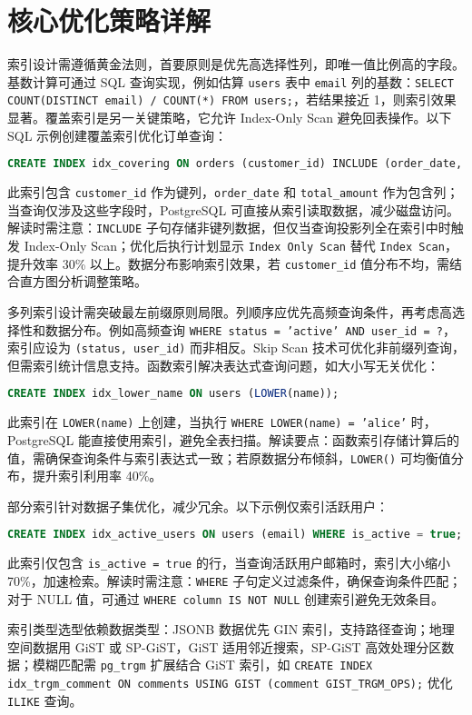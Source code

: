 \chapter{核心优化策略详解}
索引设计需遵循黄金法则，首要原则是优先高选择性列，即唯一值比例高的字段。基数计算可通过 SQL 查询实现，例如估算 \texttt{users} 表中 \texttt{email} 列的基数：\texttt{SELECT COUNT(DISTINCT email) / COUNT(*) FROM users;}，若结果接近 1，则索引效果显著。覆盖索引是另一关键策略，它允许 Index-Only Scan 避免回表操作。以下 SQL 示例创建覆盖索引优化订单查询：\par
\begin{lstlisting}[language=sql]
CREATE INDEX idx_covering ON orders (customer_id) INCLUDE (order_date, total_amount);
\end{lstlisting}
此索引包含 \texttt{customer\_{}id} 作为键列，\texttt{order\_{}date} 和 \texttt{total\_{}amount} 作为包含列；当查询仅涉及这些字段时，PostgreSQL 可直接从索引读取数据，减少磁盘访问。解读时需注意：\texttt{INCLUDE} 子句存储非键列数据，但仅当查询投影列全在索引中时触发 Index-Only Scan；优化后执行计划显示 \texttt{Index Only Scan} 替代 \texttt{Index Scan}，提升效率 30\%{} 以上。数据分布影响索引效果，若 \texttt{customer\_{}id} 值分布不均，需结合直方图分析调整策略。\par
多列索引设计需突破最左前缀原则局限。列顺序应优先高频查询条件，再考虑高选择性和数据分布。例如高频查询 \texttt{WHERE status = 'active' AND user\_{}id = ?}，索引应设为 \texttt{(status, user\_{}id)} 而非相反。Skip Scan 技术可优化非前缀列查询，但需索引统计信息支持。函数索引解决表达式查询问题，如大小写无关优化：\par
\begin{lstlisting}[language=sql]
CREATE INDEX idx_lower_name ON users (LOWER(name));
\end{lstlisting}
此索引在 \texttt{LOWER(name)} 上创建，当执行 \texttt{WHERE LOWER(name) = 'alice'} 时，PostgreSQL 能直接使用索引，避免全表扫描。解读要点：函数索引存储计算后的值，需确保查询条件与索引表达式一致；若原数据分布倾斜，\texttt{LOWER()} 可均衡值分布，提升索引利用率 40\%{}。\par
部分索引针对数据子集优化，减少冗余。以下示例仅索引活跃用户：\par
\begin{lstlisting}[language=sql]
CREATE INDEX idx_active_users ON users (email) WHERE is_active = true;
\end{lstlisting}
此索引仅包含 \texttt{is\_{}active = true} 的行，当查询活跃用户邮箱时，索引大小缩小 70\%{}，加速检索。解读时需注意：\texttt{WHERE} 子句定义过滤条件，确保查询条件匹配；对于 NULL 值，可通过 \texttt{WHERE column IS NOT NULL} 创建索引避免无效条目。\par
索引类型选型依赖数据类型：JSONB 数据优先 GIN 索引，支持路径查询；地理空间数据用 GiST 或 SP-GiST，GiST 适用邻近搜索，SP-GiST 高效处理分区数据；模糊匹配需 \texttt{pg\_{}trgm} 扩展结合 GiST 索引，如 \texttt{CREATE INDEX idx\_{}trgm\_{}comment ON comments USING GIST (comment GIST\_{}TRGM\_{}OPS);} 优化 \texttt{ILIKE} 查询。\par
